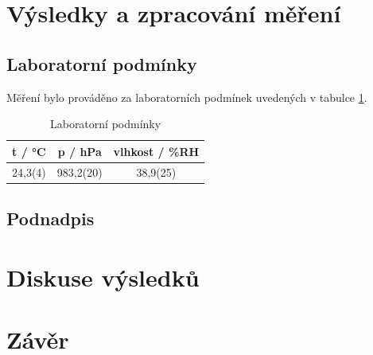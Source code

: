 \section{Výsledky a zpracování měření}

\subsection{Laboratorní podmínky}

    Měření bylo prováděno za laboratorních podmínek uvedených v tabulce \ref{tab:lab_pod}.

    \begin{table}[h]
        \centering
        \begin{tabular}{|c|c|c|} 
        \hline
            t / °C & p / hPa & vlhkost / \%RH  \\ 
        \hline
            24,3(4)   & 983,2(20)   & 38,9(25)            \\
        \hline
        \end{tabular}
        \caption{Laboratorní podmínky}
        \label{tab:lab_pod}
    \end{table}

\subsection{Podnadpis}

    
\section{Diskuse výsledků}

\section{Závěr}
